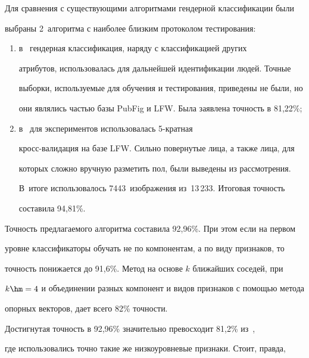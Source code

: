 Для сравнения с существующими алгоритмами гендерной классификации были 


выбраны 2~алгоритма с наиболее близким протоколом тестирования:


\begin{enumerate}[(1)]


\item в~\cite{10-k} гендерная классификация, наряду с классификацией других 


атрибутов, использовалась для дальнейшей идентификации людей. Точные 


выборки, используемые для обучения и тестирования, приведены не были, но 


они являлись частью базы PubFig и LFW. Была заявлена точность в 81,22\%;


\item в~\cite{18-k} для экспериментов использовалась 5-крат\-ная 


кросс-ва\-ли\-да\-ция на базе LFW. Сильно повернутые лица, а также лица, для 


которых сложно вручную разметить пол, были выведены из рассмотрения. 


В~итоге использовалось 7443~изображения из~13\,233. Итоговая точность 


составила 94,81\%.


\end{enumerate}














Точность предлагаемого алгоритма составила 92,96\%. При этом если на первом 


уровне классификаторы обучать не по компонентам, а по виду признаков, то 


точность понижается до 91,6\%. Метод на основе $k$ ближайших соседей, при 


$k\hm= 4$ и объединении разных компонент и видов признаков с помощью метода 


опорных векторов, дает всего 82\% точности.





Достигнутая точность в 92,96\% значительно превосходит 81,2\% из~\cite{10-k}, 


где использовались точно такие же низкоуровневые признаки. Стоит, правда, 


